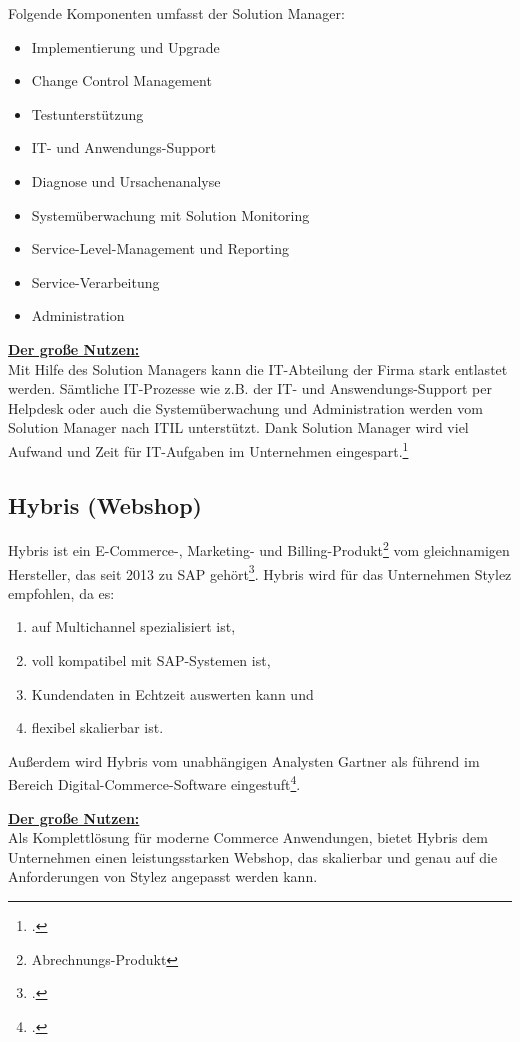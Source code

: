 Folgende Komponenten umfasst der Solution Manager:
\begin{itemize}
\item Implementierung und Upgrade
\item Change Control Management
\item Testunterstützung
\item IT- und Anwendungs-Support
\item Diagnose und Ursachenanalyse
\item Systemüberwachung mit Solution Monitoring
\item Service-Level-Management und Reporting
\item Service-Verarbeitung
\item Administration
\end{itemize}
\underline{\textbf{Der große Nutzen:}}\\
Mit Hilfe des Solution Managers kann die IT-Abteilung der Firma stark entlastet werden. Sämtliche IT-Prozesse wie z.B. der IT- und Answendungs-Support per Helpdesk oder auch die Systemüberwachung und Administration werden vom Solution Manager nach ITIL unterstützt. Dank Solution Manager wird viel Aufwand und Zeit für IT-Aufgaben im Unternehmen eingespart.\footcite[vgl.][]{SolutionManager}

\subsection{Hybris (Webshop)}
Hybris ist ein E-Commerce-, Marketing- und Billing-Produkt\footnote{Abrechnungs-Produkt} vom gleichnamigen Hersteller, das seit 2013 zu SAP gehört\footcite[vgl.][]{SAPHybris}. Hybris wird für das Unternehmen Stylez empfohlen, da es:
\begin{enumerate}
\item auf Multichannel spezialisiert ist,
\item voll kompatibel mit SAP-Systemen ist,
\item Kundendaten in Echtzeit auswerten kann und
\item flexibel skalierbar ist.
\end{enumerate}
Außerdem wird Hybris vom unabhängigen Analysten Gartner als führend im Bereich Digital-Commerce-Software eingestuft\footcite{Gartner}.

\underline{\textbf{Der große Nutzen:}}\\
Als Komplettlösung für moderne Commerce Anwendungen, bietet Hybris dem Unternehmen einen leistungsstarken Webshop, das skalierbar und genau auf die Anforderungen von Stylez angepasst werden kann.

